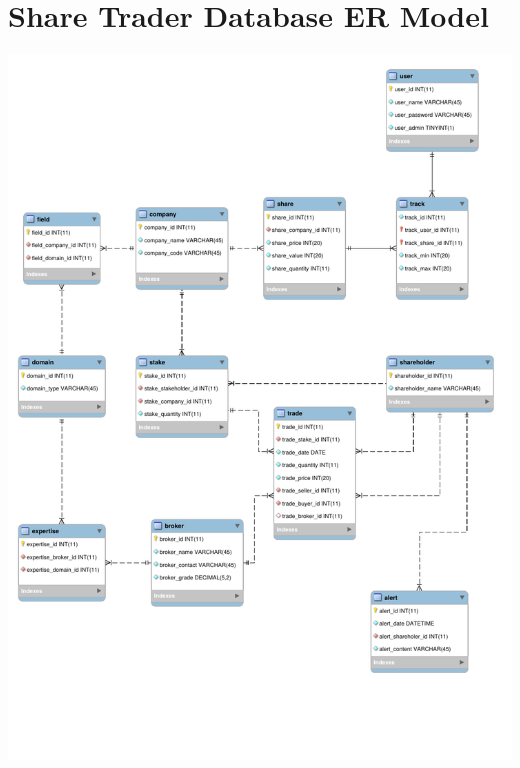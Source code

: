 \documentclass[12pt, a4paper,titlepage]{article}
\begin{document}
\clearpage




\appendix


\section{Share Trader Database ER Model}
\includegraphics[width=\textwidth]{res/share_trader_er.pdf}
\label{ap-schema}
\end{document}
